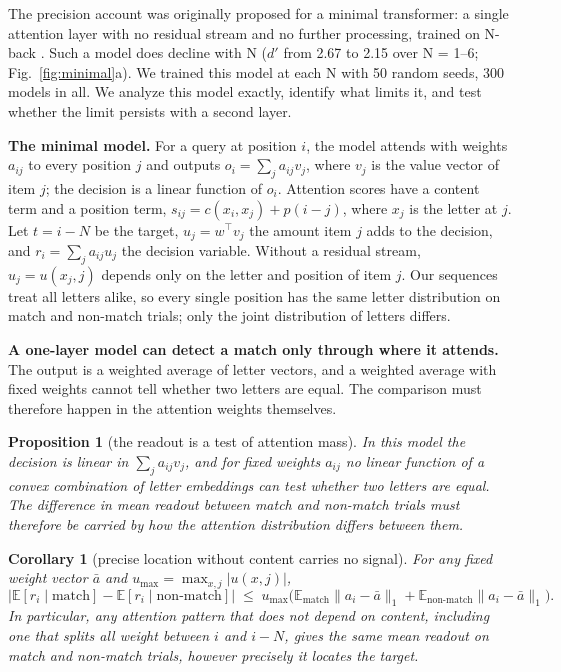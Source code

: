\documentclass{article}
\newtheorem{proposition}{Proposition}
\newtheorem{corollary}{Corollary}
\newcommand{\dprime}{$d'$}
\begin{document}
The precision account was originally proposed for a minimal transformer: a single attention layer with no residual stream and no further processing, trained on N-back \citep{gong2024selfattention}. Such a model does decline with N (\dprime{} from 2.67 to 2.15 over N = 1--6; Fig.~\ref{fig:minimal}a). We trained this model at each N with 50 random seeds, 300 models in all. We analyze this model exactly, identify what limits it, and test whether the limit persists with a second layer.

\textbf{The minimal model.} For a query at position $i$, the model attends with weights $a_{ij}$ to every position $j$ and outputs $o_i=\sum_j a_{ij}v_j$, where $v_j$ is the value vector of item $j$; the decision is a linear function of $o_i$. Attention scores have a content term and a position term, $s_{ij}=c(x_i,x_j)+p(i-j)$, where $x_j$ is the letter at $j$. Let $t=i-N$ be the target, $u_j=w^\top v_j$ the amount item $j$ adds to the decision, and $r_i=\sum_j a_{ij}u_j$ the decision variable. Without a residual stream, $u_j=u(x_j,j)$ depends only on the letter and position of item $j$. Our sequences treat all letters alike, so every single position has the same letter distribution on match and non-match trials; only the joint distribution of letters differs.

\textbf{A one-layer model can detect a match only through where it attends.} The output is a weighted average of letter vectors, and a weighted average with fixed weights cannot tell whether two letters are equal. The comparison must therefore happen in the attention weights themselves.

\begin{proposition}[the readout is a test of attention mass]\label{prop:mass}
In this model the decision is linear in $\sum_j a_{ij} v_j$, and for fixed weights $a_{ij}$ no linear function of a convex combination of letter embeddings can test whether two letters are equal. The difference in mean readout between match and non-match trials must therefore be carried by how the attention distribution differs between them.
\end{proposition}

\begin{corollary}[precise location without content carries no signal]\label{cor:fixed}
For any fixed weight vector $\bar a$ and $u_{\max}=\max_{x,j}|u(x,j)|$,
\[
\bigl|\mathbb{E}[r_i\mid\text{match}]-\mathbb{E}[r_i\mid\text{non-match}]\bigr|\;\le\;u_{\max}\bigl(\mathbb{E}_{\text{match}}\|a_i-\bar a\|_1+\mathbb{E}_{\text{non-match}}\|a_i-\bar a\|_1\bigr).
\]
In particular, any attention pattern that does not depend on content, including one that splits all weight between $i$ and $i-N$, gives the same mean readout on match and non-match trials, however precisely it locates the target.
\end{corollary}
\end{document}
